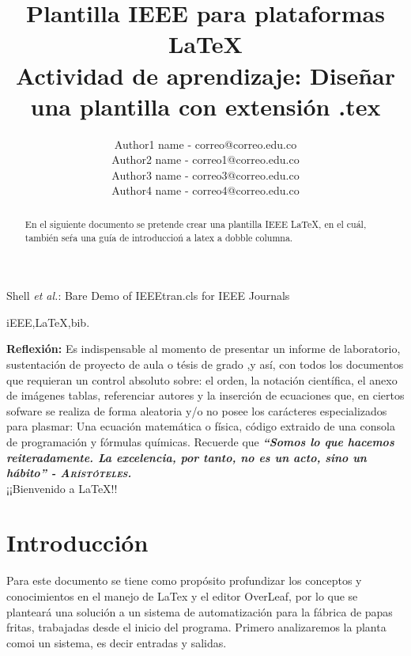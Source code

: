 \documentclass[journal, spanish]{IEEEtran}
\begin{document}
\title{Plantilla IEEE para plataformas \LaTeX \\
\small{Actividad de aprendizaje: Diseñar una plantilla con extensión .tex}}

\author{Author1 name - correo@correo.edu.co \\Author2 name - correo1@correo.edu.co \\Author3 name - correo3@correo.edu.co \\Author4 name - correo4@correo.edu.co}
        
{Shell \MakeLowercase{\textit{et al.}}: Bare Demo of IEEEtran.cls for IEEE Journals}

\maketitle

\begin{abstract} 
En el siguiente documento se pretende crear una plantilla IEEE LaTeX, en el cuál, también seŕa una guía de introduccioń a latex a dobble columna.
\end{abstract} 

\begin{IEEEkeywords}
iEEE,LaTeX,bib.\\
\end{IEEEkeywords}

\textbf{Reflexión:} Es indispensable al momento de presentar un informe de laboratorio, sustentación de proyecto de aula o tésis de grado ,y así, con todos los documentos que requieran un control absoluto sobre: el orden, la notación científica, el anexo de imágenes tablas, referenciar autores y la inserción de ecuaciones que, en ciertos sofware se realiza de forma aleatoria y/o no posee los carácteres especializados para plasmar: Una ecuación matemática o física, código extraido de una consola de programación y fórmulas químicas. Recuerde que  \textit{\textbf{“Somos lo que hacemos reiteradamente. La excelencia, por tanto, no es un acto, sino un hábito” \textsc{- Arístóteles.}}} \\¡¡Bienvenido a \LaTeX!!


\section{Introducción}
Para este documento se tiene como propósito profundizar los conceptos y conocimientos en el manejo de LaTex y el editor OverLeaf, por lo que se planteará  una solución a un sistema de automatización para la fábrica de papas fritas, trabajadas desde el inicio del programa.
Primero analizaremos la planta comoi un sistema, es decir entradas y salidas.
\end{document}
